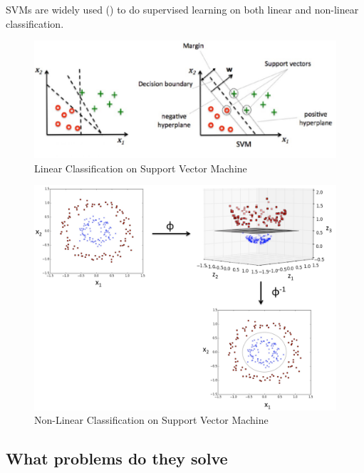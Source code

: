 \begin{enumerate}
		SVMs are widely used () to do supervised learning on both linear and non-linear classification.
		\begin{figure}[h!]
			\centering
			\includegraphics[scale=0.4]{images/svm.jpg}
			\caption{Linear Classification on Support Vector Machine}
			\label{fig:svm}
		\end{figure}
		\begin{figure}[h!]
			\centering
			\includegraphics[scale=0.18]{images/dimensions.jpg}
			\caption{Non-Linear Classification on Support Vector Machine}
			\label{fig:mapping}
		\end{figure}
	
	
	
\end{enumerate}




\subsection{What problems do they solve}\label{s:ltask}


